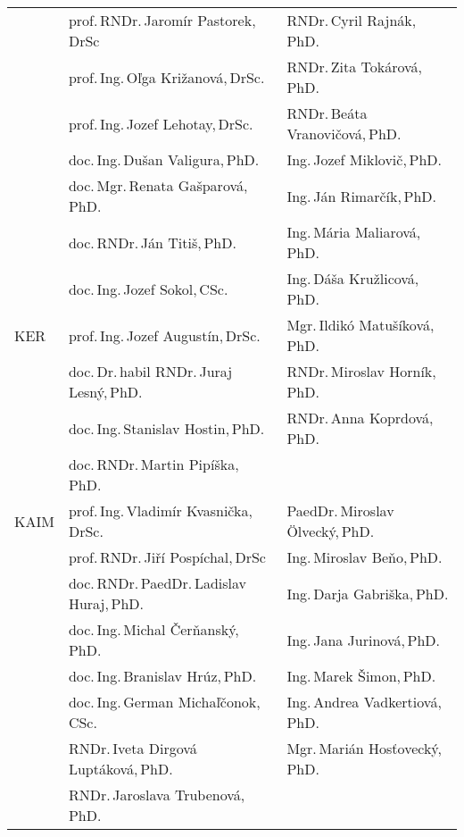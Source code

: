 \begin{table}
\begin{tabularx}{\textwidth}{lll}
         & prof.\,RNDr.\,Jaromír Pastorek,\,DrSc         & RNDr.\,Cyril Rajnák,\,PhD.           \\
         & prof.\,Ing.\,Oľga Križanová,\,DrSc.           & RNDr.\,Zita Tokárová,\,PhD.          \\
         & prof.\,Ing.\,Jozef Lehotay,\,DrSc.            & RNDr.\,Beáta Vranovičová,\,PhD.      \\
         & doc.\,Ing.\,Dušan Valigura,\,PhD.             & Ing.\,Jozef Miklovič,\,PhD.          \\
         & doc.\,Mgr.\,Renata Gašparová,\,PhD.           & Ing.\,Ján Rimarčík,\,PhD.            \\
         & doc.\,RNDr.\,Ján Titiš,\,PhD.                 & Ing.\,Mária Maliarová,\,PhD.         \\
         & doc.\,Ing.\,Jozef Sokol,\,CSc.                & Ing.\,Dáša Kružlicová,\,PhD.         \\[2ex]
    KER  & prof.\,Ing.\,Jozef Augustín,\,DrSc.           & Mgr.\,Ildikó Matušíková,\,PhD.       \\
         & doc.\,Dr.\,habil RNDr.\,Juraj Lesný,\,PhD.    & RNDr.\,Miroslav Horník,\,PhD.        \\
         & doc.\,Ing.\,Stanislav Hostin,\,PhD.           & RNDr.\,Anna Koprdová,\,PhD.          \\
         & doc.\,RNDr.\,Martin Pipíška,\,PhD.            &                                      \\[2ex]
    KAIM & prof.\,Ing.\,Vladimír Kvasnička,\,DrSc.       & PaedDr.\,Miroslav Ölvecký,\,PhD.     \\
         & prof.\,RNDr.\,Jiří Pospíchal,\,DrSc           & Ing.\,Miroslav Beňo,\,PhD.           \\
         & doc.\,RNDr.\,PaedDr.\,Ladislav Huraj,\,PhD.   & Ing.\,Darja Gabriška,\,PhD.          \\
         & doc.\,Ing.\,Michal Čerňanský,\,PhD.           & Ing.\,Jana Jurinová,\,PhD.           \\
         & doc.\,Ing.\,Branislav Hrúz,\,PhD.             & Ing.\,Marek Šimon,\,PhD.             \\
         & doc.\,Ing.\,German Michaľčonok,\,CSc.         & Ing.\,Andrea Vadkertiová,\,PhD.      \\
         & RNDr.\,Iveta Dirgová Luptáková,\,PhD.         & Mgr.\,Marián Hosťovecký,\,PhD.       \\
         & RNDr.\,Jaroslava Trubenová,\,PhD.             &                                      \\[2ex]

\end{tabularx}
\end{table}
